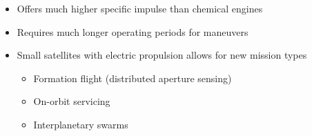 \begin{frame}
\begin{itemize}
\begin{itemize}
        \item Offers much higher specific impulse than chemical engines 
        
        \item Requires much longer operating periods for maneuvers 
        \item Small satellites with electric propulsion allows for new mission types
            \begin{itemize}
                \item Formation flight (distributed aperture sensing)
                \item On-orbit servicing
                \item Interplanetary swarms
            \end{itemize}
    \end{itemize}
\end{itemize}
\end{frame}   %

